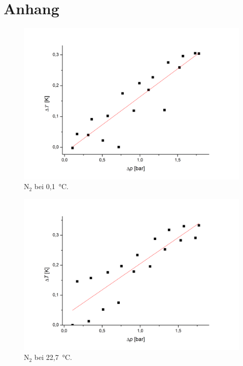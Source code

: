 \documentclass[a4paper,12pt,oneside,onecolum,final,openany]{report}
\begin{document}
\chapter{Anhang}
\begin{center}
\begin{figure}[h]
\includegraphics[width=13.5cm]{N2bei0Grad.png}
\caption{$\mathrm{N}_2$ bei 0,1~°C.}
\end{figure}
\end{center}
\begin{center}
\begin{figure}[h]
\includegraphics[width=13.5cm]{N2bei22,7.png}
\caption{$\mathrm{N}_2$ bei 22,7~°C.}
\end{figure}
\end{center}
\end{document}
